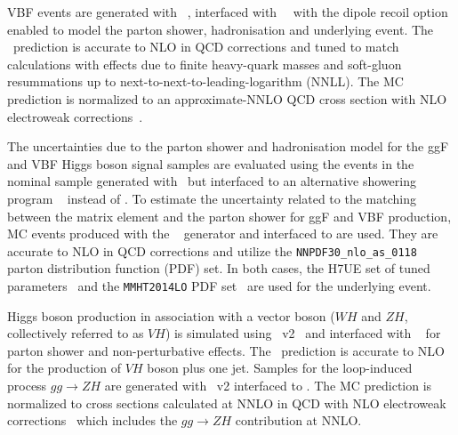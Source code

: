 VBF events are generated with \POWHEG~\cite{Nason:2004rx, Frixione:2007vw, Alioli:2010xd, Nason:2009ai}, interfaced with ~\cite{Sjostrand:2014zea}~with the dipole recoil option enabled to model the parton shower, hadronisation and underlying event.
The \POWHEG\ prediction is accurate to NLO in QCD corrections and tuned to match calculations with effects due to finite heavy-quark masses and soft-gluon resummations up to next-to-next-to-leading-logarithm (NNLL).
The MC prediction is normalized to an approximate-NNLO QCD cross section with NLO electroweak corrections~\cite{PhysRevLett.99.161803, Ciccolini:2007ec, PhysRevLett.105.011801}.

The uncertainties due to the parton shower and hadronisation model for the ggF and VBF Higgs boson signal samples are
evaluated using the events in the nominal sample generated with \POWHEG\ but interfaced to an alternative showering program
~\cite{Bahr:2008pv,Bellm:2015jjp} instead of . To estimate the uncertainty related to the matching between the matrix element and the parton shower for ggF and VBF production, MC events produced with the \MGFiveNLO~\cite{Alwall:2014hca} generator and interfaced to  are used. They are accurate to NLO in QCD corrections and utilize the \texttt{NNPDF30\_nlo\_as\_0118}~\cite{Ball:2014uwa} parton distribution function (PDF) set.
In both cases, the H7UE set of tuned parameters~\cite{Bellm:2015jjp} and the \texttt{MMHT2014LO} PDF set~\cite{Harland-Lang:2014zoa} are used for the underlying event.

Higgs boson production in association with a vector boson ($WH$ and $ZH$, collectively referred to as $VH$) is simulated using \powhegbox~v2~\cite{Nason:2009ai,Alioli:2010xd,Nason:2004rx,Frixione:2007vw} and interfaced with ~\cite{Sjostrand:2014zea} for parton shower and non-perturbative effects.
The \POWHEG\ prediction is accurate to NLO for the production of $VH$ boson plus one jet. Samples for the loop-induced process $gg \to ZH$ are generated with \powhegbox~v2 interfaced to .
The MC prediction is normalized to cross sections calculated at NNLO in QCD with NLO electroweak corrections~\cite{Ciccolini:2003jy, Brein:2003wg, Brein:2011vx, Denner:2014cla, Brein:2012ne} which includes the $gg \to ZH$ contribution at NNLO.

